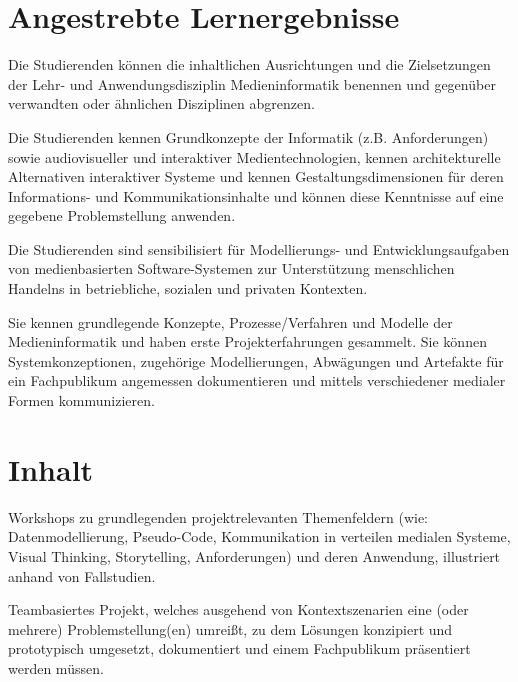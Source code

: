 \hypertarget{angestrebte-lernergebnissepathlabelmi-2017modulbeschreibungen-bachelorba_einfhrungindiemedieninformatik}{%
\section*{Angestrebte
Lernergebnisse\label{/mi-2017/modulbeschreibungen-bachelor/BA_EinfhrungindieMedieninformatik}}\label{angestrebte-lernergebnissepathlabelmi-2017modulbeschreibungen-bachelorba_einfhrungindiemedieninformatik}}

Die Studierenden können die inhaltlichen Ausrichtungen und die
Zielsetzungen der Lehr- und Anwendungsdisziplin Medieninformatik
benennen und gegenüber verwandten oder ähnlichen Disziplinen abgrenzen.

Die Studierenden kennen Grundkonzepte der Informatik (z.B.
Anforderungen) sowie audiovisueller und interaktiver Medientechnologien,
kennen architekturelle Alternativen interaktiver Systeme und kennen
Gestaltungsdimensionen für deren Informations- und Kommunikationsinhalte
und können diese Kenntnisse auf eine gegebene Problemstellung anwenden.

Die Studierenden sind sensibilisiert für Modellierungs- und
Entwicklungsaufgaben von medienbasierten Software-Systemen zur
Unterstützung menschlichen Handelns in betriebliche, sozialen und
privaten Kontexten.

Sie kennen grundlegende Konzepte, Prozesse/Verfahren und Modelle der
Medieninformatik und haben erste Projekterfahrungen gesammelt. Sie
können Systemkonzeptionen, zugehörige Modellierungen, Abwägungen und
Artefakte für ein Fachpublikum angemessen dokumentieren und mittels
verschiedener medialer Formen kommunizieren.

\hypertarget{inhaltpathlabelmi-2017modulbeschreibungen-bachelorba_einfhrungindiemedieninformatik}{%
\section*{Inhalt\label{/mi-2017/modulbeschreibungen-bachelor/BA_EinfhrungindieMedieninformatik}}\label{inhaltpathlabelmi-2017modulbeschreibungen-bachelorba_einfhrungindiemedieninformatik}}

Workshops zu grundlegenden projektrelevanten Themenfeldern (wie:
Datenmodellierung, Pseudo-Code, Kommunikation in verteilen medialen
Systeme, Visual Thinking, Storytelling, Anforderungen) und deren
Anwendung, illustriert anhand von Fallstudien.

Teambasiertes Projekt, welches ausgehend von Kontextszenarien eine (oder
mehrere) Problemstellung(en) umreißt, zu dem Lösungen konzipiert und
prototypisch umgesetzt, dokumentiert und einem Fachpublikum präsentiert
werden müssen.

